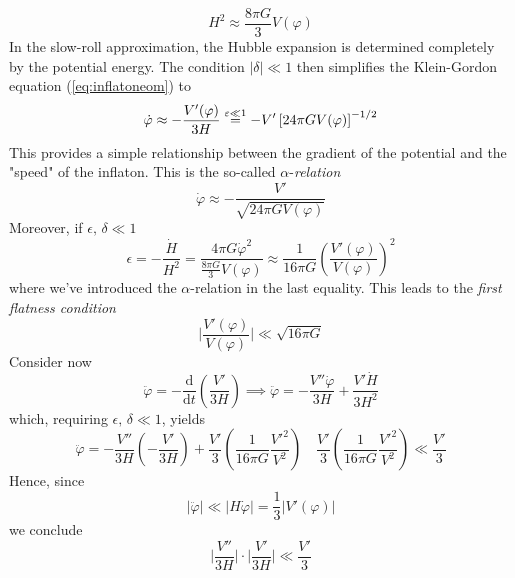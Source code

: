 \begin{equation}
    \boxed{
    H^{2} \approx \frac{8\pi G}{3}V(\varphi)
    }
    \label{eq:slowrollfriedmann}
\end{equation}
In the slow-roll approximation, the Hubble expansion is determined completely by the potential energy. The condition $|\delta| \ll 1$ then simplifies the Klein-Gordon equation (\ref{eq:inflatoneom}) to
\begin{equation}
    \dot{\varphi} \approx -\frac{V'(\varphi)}{3H} \textoversymbol{=}{\varepsilon \ll 1} -V'\left[24\pi G V(\varphi)\right]^{-1/2}
\end{equation}
This provides a simple relationship between the gradient of the potential and the "speed" of the inflaton. This is the so-called $\alpha$-\emph{relation}
\begin{equation}
    \boxed{
    \dot{\varphi} \approx -\frac{V'}{\sqrt{24 \pi G V(\varphi)}}
    }
    \label{eq:alpharel}
\end{equation}
Moreover, if $\epsilon,\,\delta \ll 1$
\begin{equation}
    \epsilon = -\frac{\dot{H}}{H^{2}} = \frac{4\pi G \dot{\varphi}^{2}}{\frac{8\pi G}{3}V(\varphi)} \approx \frac{1}{16\pi G}\left(\frac{V'(\varphi)}{V(\varphi)}\right)^{2}
\end{equation}
where we've introduced the $\alpha$-relation in the last equality. This leads to the \emph{first flatness condition}
\begin{equation}
    \boxed{
    \Big|\frac{V'(\varphi)}{V(\varphi)}\Big| \ll \sqrt{16\pi G}
    }
    \label{eq:flatness1}
\end{equation}
Consider now 
\begin{equation}
    \ddot{\varphi} = -\frac{\text{d}}{\text{d}t}\left(\frac{V'}{3H}\right) \implies \ddot{\varphi} = -\frac{V''\dot{\varphi}}{3H} + \frac{V'\dot{H}}{3H^{2}}
\end{equation}
which, requiring $\epsilon,\,\delta \ll 1$, yields
\begin{equation}
   \ddot{\varphi} = -\frac{V''}{3H}\left(-\frac{V'}{3H}\right) + \frac{V'}{3}\left(\frac{1}{16\pi G}\frac{V'^{2}}{V^{2}}\right) \quad \frac{V'}{3}\left(\frac{1}{16\pi G}\frac{V'^{2}}{V^{2}}\right) \ll \frac{V'}{3}
\end{equation}
Hence, since 
\begin{equation}
    |\ddot{\varphi}| \ll |H\dot{\varphi}| = \frac{1}{3}|V'(\varphi)|
\end{equation}
we conclude 
\begin{equation}
    \Big|\frac{V''}{3H}\Big|\cdot \Big|\frac{V'}{3H}\Big| \ll \frac{V'}{3}
\end{equation}

